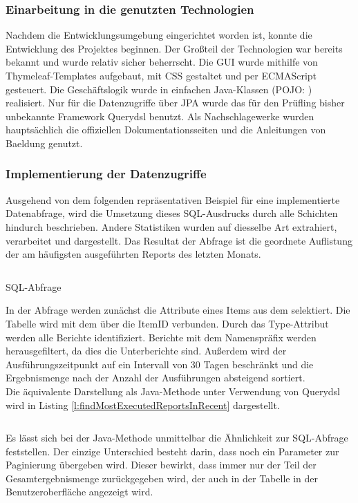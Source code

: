 \subsubsection{Einarbeitung in die genutzten Technologien}\label{sec:Technologien}
Nachdem die Entwicklungsumgebung eingerichtet worden ist, konnte die Entwicklung des Projektes beginnen. Der Großteil der Technologien war bereits bekannt und wurde relativ sicher beherrscht. Die \ac{GUI} wurde mithilfe von Thymeleaf-Templates aufgebaut, mit CSS gestaltet und per ECMAScript gesteuert. Die Geschäftslogik wurde in einfachen Java-Klassen (\acs{POJO}: ) realisiert. Nur für die Datenzugriffe über \ac{JPA} wurde das für den Prüfling bisher unbekannte Framework Querydsl benutzt. Als Nachschlagewerke wurden hauptsächlich die offiziellen Dokumentationsseiten und die Anleitungen von Baeldung genutzt.

\subsubsection{Implementierung der Datenzugriffe}\label{sec:ImplementierungDatenzugriffe}
Ausgehend von dem folgenden repräsentativen Beispiel für eine implementierte Datenabfrage, wird die Umsetzung dieses SQL-Ausdrucks durch alle Schichten hindurch beschrieben. Andere Statistiken wurden auf diesselbe Art extrahiert, verarbeitet und dargestellt. Das Resultat der Abfrage ist die geordnete Auflistung der am häufigsten ausgeführten Reports des letzten Monats.
\begin{listing}[ht]
  \inputminted{tsql}{Listings/most_used_reports.sql}
  \caption{SQL-Abfrage}
  \label{l:sql}
\end{listing}
In der Abfrage werden zunächst die Attribute eines Items aus dem  selektiert. Die Tabelle  wird mit dem  über die ItemID verbunden. Durch das Type-Attribut werden alle Berichte identifiziert. Berichte mit dem Namenspräfix  werden herausgefiltert, da dies die Unterberichte sind. Außerdem wird der Ausführungszeitpunkt auf ein Intervall von 30 Tagen beschränkt und die Ergebnismenge nach der Anzahl der Ausführungen absteigend sortiert.\\
Die äquivalente Darstellung als Java-Methode unter Verwendung von Querydsl wird in Listing \ref{l:findMostExecutedReportsInRecent} dargestellt.
\begin{listing}[ht]
  \inputminted{java}{Listings/findMostExecutedReportsInRecent().java}
  \caption{}
  \label{l:findMostExecutedReportsInRecent}
\end{listing}
Es lässt sich bei der Java-Methode unmittelbar die Ähnlichkeit zur SQL-Abfrage feststellen. Der einzige Unterschied besteht darin, dass noch ein Parameter zur Paginierung übergeben wird. Dieser bewirkt, dass immer nur der Teil der Gesamtergebnismenge zurückgegeben wird, der auch in der Tabelle in der Benutzeroberfläche angezeigt wird.

